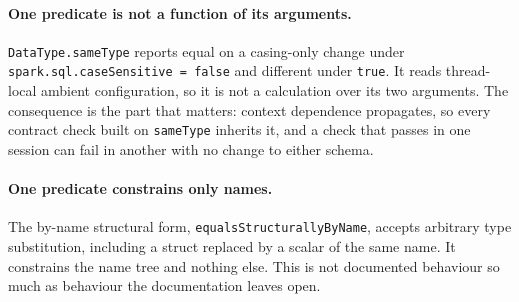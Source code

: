 \paragraph{One predicate is not a function of its arguments.} \texttt{DataType.sameType} reports equal on a casing-only change under \texttt{spark.sql.caseSensitive = false} and different under \texttt{true}. It reads thread-local ambient configuration, so it is not a calculation over its two arguments. The consequence is the part that matters: context dependence propagates, so every contract check built on \texttt{sameType} inherits it, and a check that passes in one session can fail in another with no change to either schema.

\paragraph{One predicate constrains only names.} The by-name structural form, \texttt{equalsStructurallyByName}, accepts arbitrary type substitution, including a struct replaced by a scalar of the same name. It constrains the name tree and nothing else. This is not documented behaviour so much as behaviour the documentation leaves open.

